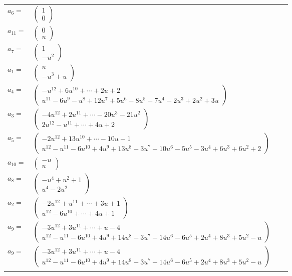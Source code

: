 \documentclass[1p]{elsarticle_modified}
\theoremstyle{definition}
\begin{document}
\begin{tabular}{m{7pt} m{180pt} m{7pt} m{180pt} }
\flushright $a_{6}=$&$\begin{pmatrix}1\\0\end{pmatrix}$ \\
\flushright $a_{11}=$&$\begin{pmatrix}0\\u\end{pmatrix}$ \\
\flushright $a_{7}=$&$\begin{pmatrix}1\\- u^2\end{pmatrix}$ \\
\flushright $a_{1}=$&$\begin{pmatrix}u\\- u^3+u\end{pmatrix}$ \\
\flushright $a_{4}=$&$\begin{pmatrix}- u^{12}+6 u^{10}+\cdots+2 u+2\\u^{11}-6 u^9- u^8+12 u^7+5 u^6-8 u^5-7 u^4-2 u^3+2 u^2+3 u\end{pmatrix}$ \\
\flushright $a_{3}=$&$\begin{pmatrix}-4 u^{12}+2 u^{11}+\cdots-20 u^3-21 u^2\\2 u^{12}- u^{11}+\cdots+4 u+2\end{pmatrix}$ \\
\flushright $a_{5}=$&$\begin{pmatrix}-2 u^{12}+13 u^{10}+\cdots-10 u-1\\u^{12}- u^{11}-6 u^{10}+4 u^9+13 u^8-3 u^7-10 u^6-5 u^5-3 u^4+6 u^3+6 u^2+2\end{pmatrix}$ \\
\flushright $a_{10}=$&$\begin{pmatrix}- u\\u\end{pmatrix}$ \\
\flushright $a_{8}=$&$\begin{pmatrix}- u^4+u^2+1\\u^4-2 u^2\end{pmatrix}$ \\
\flushright $a_{2}=$&$\begin{pmatrix}-2 u^{12}+u^{11}+\cdots+3 u+1\\u^{12}-6 u^{10}+\cdots+4 u+1\end{pmatrix}$ \\
\flushright $a_{9}=$&$\begin{pmatrix}-3 u^{12}+3 u^{11}+\cdots+u-4\\u^{12}- u^{11}-6 u^{10}+4 u^9+14 u^8-3 u^7-14 u^6-6 u^5+2 u^4+8 u^3+5 u^2- u\end{pmatrix}$\\ \flushright $a_{9}=$&$\begin{pmatrix}-3 u^{12}+3 u^{11}+\cdots+u-4\\u^{12}- u^{11}-6 u^{10}+4 u^9+14 u^8-3 u^7-14 u^6-6 u^5+2 u^4+8 u^3+5 u^2- u\end{pmatrix}$\\&\end{tabular}
\end{document}
